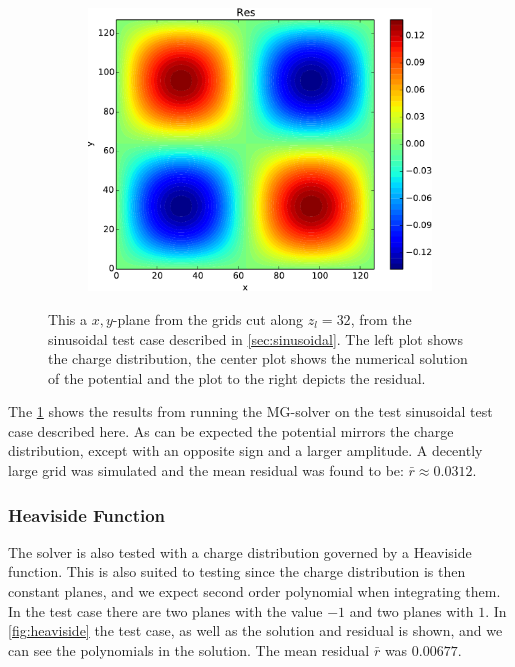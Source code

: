 \begin{figure}
\begin{subfigure}[b]{0.32\textwidth}
				\end{subfigure}
				\begin{subfigure}[b]{0.32\textwidth}
					\includegraphics[width = \textwidth]{figures/verification/sinusoidal/residual.pdf}
				\end{subfigure}
			\caption{This a \(x,y\)-plane from the grids cut along \(z_l = 32\), from the sinusoidal test case described in \cref{sec:sinusoidal}.
			The left plot shows the charge distribution, the center plot shows the numerical solution of the potential and the plot to the right depicts
			the residual.}
			\label{fig:sinusoidal}
		\end{figure}

		The \cref{fig:sinusoidal} shows the results from running the MG-solver on the test sinusoidal test case described here.
		As can be expected the potential mirrors the charge distribution, except with an opposite sign and a larger amplitude.
		A decently large grid was simulated and the mean residual was found to be: \(\bar{r} \approx 0.0312\).


		\subsubsection{Heaviside Function}
			The solver is also tested with a charge distribution governed by a Heaviside
			function. This is also suited to testing since the charge distribution is then
			constant planes, and we expect second order polynomial when integrating them.
			In the test case there are two planes with the value \(-1\) and two
			planes with \(1\). In \cref{fig:heaviside} the test case, as well as the solution and residual is
			shown, and we can see the polynomials in the solution. The mean residual \(\bar{r}\) was
			\(0.00677\).

